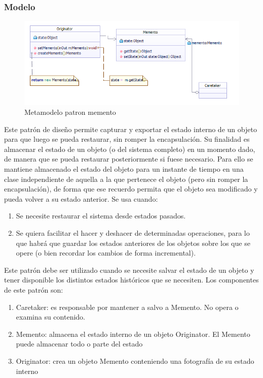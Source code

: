\subsubsection{Modelo}
\begin{figure}[th!]
	\centering
	\includegraphics[width=0.9\linewidth]{arquitectura/imagenes/PatronMemento}
	\caption{Metamodelo patron memento}
	\label{fig:Metamodelo patron memento}
\end{figure}

Este patrón de diseño permite capturar y exportar el estado interno de un objeto para que luego se pueda restaurar, sin romper la encapsulación.
Su finalidad es almacenar el estado de un objeto (o del sistema completo) en un momento dado, de manera que se pueda restaurar posteriormente si fuese necesario. Para ello se mantiene almacenado el estado del objeto para un instante de tiempo en una clase independiente de aquella a la que pertenece el objeto (pero sin romper la encapsulación), de forma que ese recuerdo permita que el objeto sea modificado y pueda volver a su estado anterior.
\newline
Se usa cuando:
\begin{enumerate}
	\item Se necesite restaurar el sistema desde estados pasados.
	\item Se quiera facilitar el hacer y deshacer de determinadas operaciones, para lo que habrá que guardar los estados anteriores de los objetos sobre los que se opere (o bien recordar los cambios de forma incremental).
\end{enumerate}
Este patrón debe ser utilizado cuando se necesite salvar el estado de un objeto y tener disponible los distintos estados históricos que se necesiten.
\newline
Los componentes de este patrón son:
\begin{enumerate}
	\item Caretaker: es responsable por mantener a salvo a Memento. No opera o examina su contenido.
	\item Memento: almacena el estado interno de un objeto Originator. El Memento puede almacenar todo o parte del estado
	\item Originator: crea un objeto Memento conteniendo una fotografía de su estado interno
\end{enumerate}

